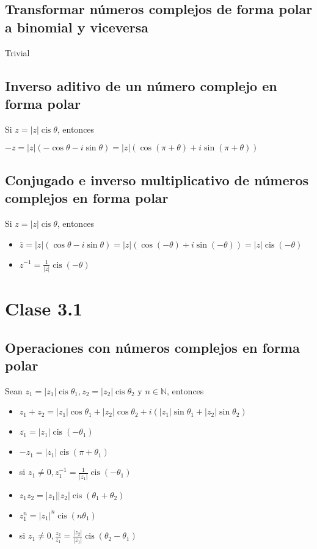\documentclass{article}
\DeclareMathOperator\cis{cis}
\begin{document}
\subsection{Transformar números complejos de forma polar a binomial y viceversa}
Trivial

\subsection{Inverso aditivo de un número complejo en forma polar}
Si $z=|z|\cis{\theta}$, entonces
\begin{center}
    $-z=|z|(-\cos{\theta}-i\sin{\theta})=|z|(\cos{(\pi+\theta)}+i\sin{(\pi + \theta)})$
\end{center}

\subsection{Conjugado e inverso multiplicativo de números complejos en
forma polar}
Si $z=|z|\cis{\theta}$, entonces
\begin{itemize}
    \item$\overline{z}=|z|(\cos{\theta}-i\sin{\theta})=|z|(\cos{(-\theta)}+i\sin{(-\theta)})=|z|\cis{(-\theta)}$
    \item $z^{-1}=\frac{1}{|z|}\cis{(-\theta)}$
\end{itemize}

\section{Clase 3.1}

\subsection{Operaciones con números complejos en forma polar}
Sean $z_1=|z_1|\cis{\theta_1}, z_2=|z_2|\cis{\theta_2}$ y $n\in \mathbb{N}$, entonces
\begin{itemize}
    \item $z_1+z_2=|z_1|\cos{\theta_1}+|z_2|\cos{\theta_2}+i(|z_1|\sin{\theta_1}+|z_2|\sin{\theta_2})$
    
    \item $\overline{z_1}=|z_1|\cis{(-\theta_1)}$
    
    \item $-z_1=|z_1|\cis{(\pi + \theta_1)}$
    
    \item si $z_1\ne 0, z_{1}^{-1}=\frac{1}{|z_1|}\cis{(-\theta_1)}$
    
    \item $z_1z_2=|z_1||z_2|\cis{(\theta_1+\theta_2)}$
    
    \item $z_{1}^{n}=|z_1|^n\cis{(n\theta_1)}$
    
    \item si $z_1\ne 0, \frac{z_2}{z_1}=\frac{|z_2|}{|z_1|}\cis{(\theta_2-\theta_1)}$
\end{itemize}
\end{document}
